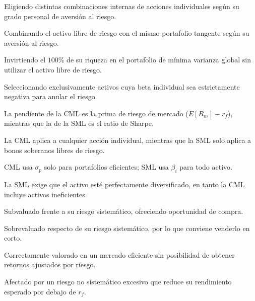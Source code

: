 \begin{opts}
    \item Eligiendo distintas combinaciones internas de acciones individuales según su grado personal de aversión al riesgo.
    \item Combinando el activo libre de riesgo con el mismo portafolio tangente según su aversión al riesgo.
    \item Invirtiendo el $100\%$ de su riqueza en el portafolio de mínima varianza global sin utilizar el activo libre de riesgo.
    \item Seleccionando exclusivamente activos cuya beta individual sea estrictamente negativa para anular el riesgo.
\end{opts}

\begin{opts}
    \item La pendiente de la CML es la prima de riesgo de mercado ($E[R_m] - r_f$), mientras que la de la SML es el ratio de Sharpe.
    \item La CML aplica a cualquier acción individual, mientras que la SML solo aplica a bonos soberanos libres de riesgo.
    \item CML usa $\sigma_p$ solo para portafolios eficientes; SML usa $\beta_i$ para todo activo.
    \item La SML exige que el activo esté perfectamente diversificado, en tanto la CML incluye activos ineficientes.
\end{opts}

\begin{opts}
    \item Subvaluado frente a su riesgo sistemático, ofreciendo oportunidad de compra.
    \item Sobrevaluado respecto de su riesgo sistemático, por lo que conviene venderlo en corto.
    \item Correctamente valorado en un mercado eficiente sin posibilidad de obtener retornos ajustados por riesgo.
    \item Afectado por un riesgo no sistemático excesivo que reduce su rendimiento esperado por debajo de $r_f$.
\end{opts}

